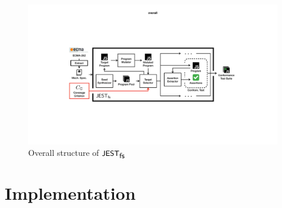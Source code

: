 
%

\begin{figure}
  \includegraphics[width=.9\textwidth]{img/overall}
\vspace*{-.5em}
  \caption{Overall structure of $\textsf{\small JEST}_{\textsf{\small fs}}$}
  \label{fig:overall}
\vspace*{-1em}
\end{figure}

\section{Implementation}\label{sec:impl}


